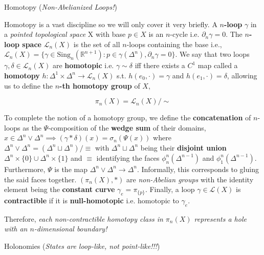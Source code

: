 \documentclass[final]{beamer}
\newenvironment{highlight}
{\begin{tcolorbox}[colback=lightblue, boxrule=0pt, frame empty]}
{\end{tcolorbox}}
\newlength{\colwidth}
\newcommand{\mb}{\mathbb}
\newcommand{\mc}{\mathcal}
\newcommand{\sing}{\text{Sing}}
\theoremstyle{remark}
\begin{document}
\begin{frame}[t]
\begin{columns}[t]
\begin{column}{\colwidth}

\begin{block}{Homotopy (\emph{Non-Abelianized Loops!})}

Homotopy is a vast discipline so we will only cover it very briefly. A \textbf{$n$-loop} $\gamma$ in a \emph{pointed topological space} X with base $p \in X$ is an $n$-cycle i.e. $\partial_n \gamma = 0$. The \textbf{$n$-loop space} $\mc{L}_n(X)$ is the set of all $n$-loops containing the base i.e., $\mc{L}_n(X) = \{ \gamma \in \sing_n(\mb{R}^{n+1}) : p \in \gamma(\Delta^n), \partial_n \gamma = 0 \}$. We say that two loops $\gamma, \delta \in \mc{L}_n(X)$ are \textbf{homotopic} i.e. $\gamma \sim \delta$ iff there exists a $C^1$ map called a \textbf{homotopy} $h : \Delta^1 \times \Delta^n \to \mc{L}_n(X)$ s.t. $h(e_0, \cdot) = \gamma$ and $h(e_1, \cdot) = \delta$, allowing us to define the \textbf{$n$-th homotopy group} of $X$,

\begin{highlight}
$$\pi_n(X) = \mc{L}_n(X)/\sim$$
\end{highlight}

To complete the notion of a homotopy group, we define the \textbf{concatenation} of $n$-loops as the $\Psi$-composition of the \textbf{wedge sum} of their domains, $x \in \Delta^n \vee \Delta^n \implies (\gamma * \delta)(x) = \sigma_n(\Psi(x))$ where $\Delta^n \vee \Delta^n = \left( \Delta^n \sqcup \Delta^n \right)/\equiv$ with $\Delta^n \sqcup \Delta^n$ being their \textbf{disjoint union} $\Delta^n \times \{ 0 \} \cup \Delta^n \times \{ 1 \}$ and $\equiv$ identifying the faces $\phi^n_n(\Delta^{n-1})$ and $\phi^n_1(\Delta^{n-1})$. Furthermore, $\Psi$ is the map $\Delta^n \vee \Delta^n \to \Delta^n$. Informally, this corresponds to gluing the said faces together. $(\pi_n(X), *)$ are \emph{non-Abelian groups} with the identity element being the \textbf{constant curve} $\gamma_e = \pi_{\{ p \}}$. Finally, a loop $\gamma \in \mc{L}(X)$ is \textbf{contractible} if it is \textbf{null-homotopic} i.e. homotopic to $\gamma_e$.

Therefore, \emph{each non-contractible homotopy class in $\pi_n(X)$ represents a hole with an $n$-dimensional boundary!}

\end{block}

\begin{block}{Holonomies (\emph{States are loop-like, \emph{not} point-like!!!})}


\end{block}
\end{column}
\end{columns}
\end{frame}
\end{document}
